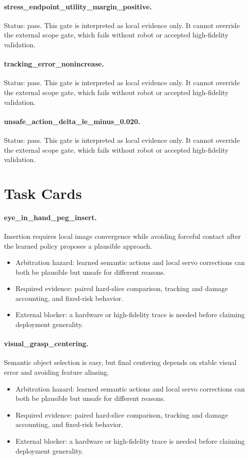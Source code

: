 \documentclass{article}
\begin{document}
\paragraph{stress\_endpoint\_utility\_margin\_positive.} Status: pass. This gate is interpreted as local evidence only. It cannot override the external scope gate, which fails without robot or accepted high-fidelity validation.
\paragraph{tracking\_error\_nonincrease.} Status: pass. This gate is interpreted as local evidence only. It cannot override the external scope gate, which fails without robot or accepted high-fidelity validation.
\paragraph{unsafe\_action\_delta\_le\_minus\_0.020.} Status: pass. This gate is interpreted as local evidence only. It cannot override the external scope gate, which fails without robot or accepted high-fidelity validation.
\clearpage
\section{Task Cards}
\paragraph{eye\_in\_hand\_peg\_insert.} Insertion requires local image convergence while avoiding forceful contact after the learned policy proposes a plausible approach.
\begin{itemize}
\item Arbitration hazard: learned semantic actions and local servo corrections can both be plausible but unsafe for different reasons.
\item Required evidence: paired hard-slice comparison, tracking and damage accounting, and fixed-risk behavior.
\item External blocker: a hardware or high-fidelity trace is needed before claiming deployment generality.
\end{itemize}
\paragraph{visual\_grasp\_centering.} Semantic object selection is easy, but final centering depends on stable visual error and avoiding feature aliasing.
\begin{itemize}
\item Arbitration hazard: learned semantic actions and local servo corrections can both be plausible but unsafe for different reasons.
\item Required evidence: paired hard-slice comparison, tracking and damage accounting, and fixed-risk behavior.
\item External blocker: a hardware or high-fidelity trace is needed before claiming deployment generality.
\end{itemize}
\end{document}
